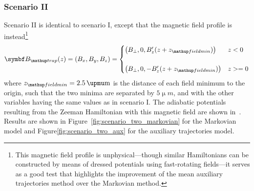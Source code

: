 \subsubsection{Scenario II}
Scenario II is identical to scenario I, except that the magnetic field profile is instead\footnote{This magnetic field profile is unphysical---though similar Hamiltonians can be constructed by means of dressed potentials using fast-rotating fields---it serves as a good test that highlights the improvement of the mean auxiliary trajectories method over the Markovian method.}
\begin{align}
\vec B_\up{trap}(z) = (B_x, B_y, B_z) = \begin{cases}
\left(B_\perp, 0, B_z^\prime (z + z_\up{fieldmin})\right) & z < 0\\
\\
\left(B_\perp, 0, -B_z^\prime  (z + z_\up{fieldmin})\right) & z >= 0
\end{cases}
\end{align}
where $z_\up{fieldmin} = 2.5\unit{\upmu m}$ is the distance of each field minimum to the origin, such that the two minima are separated by $5\unit{\upmu m}$, and with the other variables having the same values as in scenario I. The adiabatic potentials resulting from the Zeeman Hamiltonian with this magnetic field are shown in~. Results are shown in Figure~\ref{fig:scenario_two_markovian} for the Markovian model and Figure\ref{fig:scenario_two_aux} for the auxiliary trajectories model.

